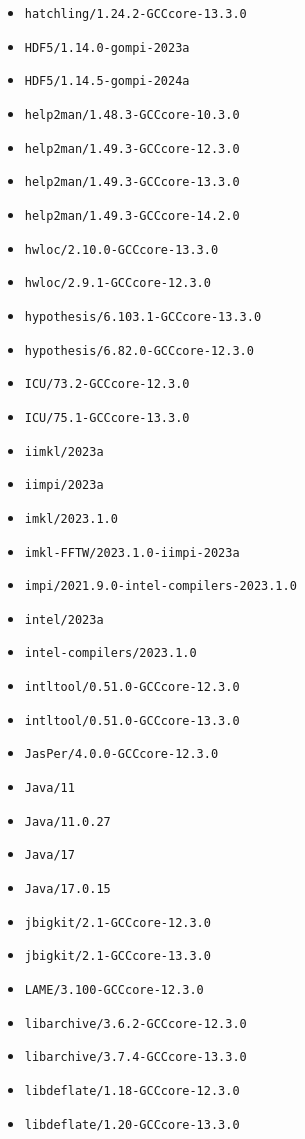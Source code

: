 \begin{multicols}{3}
\begin{itemize}
\item \verb|hatchling/1.24.2-GCCcore-13.3.0|
\item \verb|HDF5/1.14.0-gompi-2023a|
\item \verb|HDF5/1.14.5-gompi-2024a|
\item \verb|help2man/1.48.3-GCCcore-10.3.0|
\item \verb|help2man/1.49.3-GCCcore-12.3.0|
\item \verb|help2man/1.49.3-GCCcore-13.3.0|
\item \verb|help2man/1.49.3-GCCcore-14.2.0|
\item \verb|hwloc/2.10.0-GCCcore-13.3.0|
\item \verb|hwloc/2.9.1-GCCcore-12.3.0|
\item \verb|hypothesis/6.103.1-GCCcore-13.3.0|
\item \verb|hypothesis/6.82.0-GCCcore-12.3.0|
\item \verb|ICU/73.2-GCCcore-12.3.0|
\item \verb|ICU/75.1-GCCcore-13.3.0|
\item \verb|iimkl/2023a|
\item \verb|iimpi/2023a|
\item \verb|imkl/2023.1.0|
\item \verb|imkl-FFTW/2023.1.0-iimpi-2023a|
\item \verb|impi/2021.9.0-intel-compilers-2023.1.0|
\item \verb|intel/2023a|
\item \verb|intel-compilers/2023.1.0|
\item \verb|intltool/0.51.0-GCCcore-12.3.0|
\item \verb|intltool/0.51.0-GCCcore-13.3.0|
\item \verb|JasPer/4.0.0-GCCcore-12.3.0|
\item \verb|Java/11|
\item \verb|Java/11.0.27|
\item \verb|Java/17|
\item \verb|Java/17.0.15|
\item \verb|jbigkit/2.1-GCCcore-12.3.0|
\item \verb|jbigkit/2.1-GCCcore-13.3.0|
\item \verb|LAME/3.100-GCCcore-12.3.0|
\item \verb|libarchive/3.6.2-GCCcore-12.3.0|
\item \verb|libarchive/3.7.4-GCCcore-13.3.0|
\item \verb|libdeflate/1.18-GCCcore-12.3.0|
\item \verb|libdeflate/1.20-GCCcore-13.3.0|

\end{itemize}
\end{multicols}
